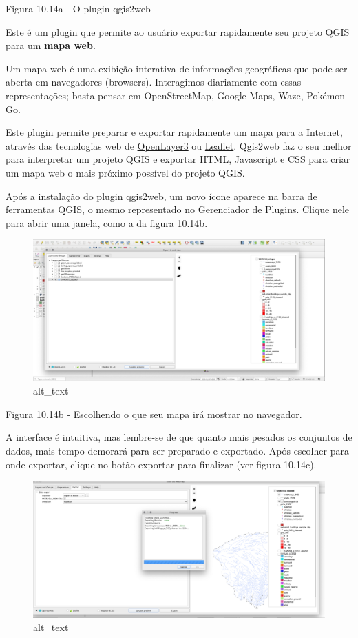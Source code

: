 \documentclass[
]{book}
\begin{document}
Figura 10.14a - O plugin qgis2web

Este é um plugin que permite ao usuário exportar rapidamente seu projeto QGIS para um \textbf{mapa web}.

Um mapa web é uma exibição interativa de informações geográficas que pode ser aberta em navegadores (browsers). Interagimos diariamente com essas representações; basta pensar em OpenStreetMap, Google Maps, Waze, Pokémon Go.

Este plugin permite preparar e exportar rapidamente um mapa para a Internet, através das tecnologias web de \href{https://openlayers.org/}{OpenLayer3} ou \href{https://leafletjs.com/}{Leaflet}. Qgis2web faz o seu melhor para interpretar um projeto QGIS e exportar HTML, Javascript e CSS para criar um mapa web o mais próximo possível do projeto QGIS.

Após a instalação do plugin qgis2web, um novo ícone aparece na barra de ferramentas QGIS, o mesmo representado no Gerenciador de Plugins. Clique nele para abrir uma janela, como a da figura 10.14b.

\begin{figure}
\centering
\includegraphics{media/modulo10/fig1014_b.png}
\caption{alt\_text}
\end{figure}

Figura 10.14b - Escolhendo o que seu mapa irá mostrar no navegador.

A interface é intuitiva, mas lembre-se de que quanto mais pesados \hspace{0pt}\hspace{0pt}os conjuntos de dados, mais tempo demorará para ser preparado e exportado. Após escolher para onde exportar, clique no botão exportar para finalizar (ver figura 10.14c).

\begin{figure}
\centering
\includegraphics{media/modulo10/fig1014_c.png}
\caption{alt\_text}
\end{figure}
\end{document}
